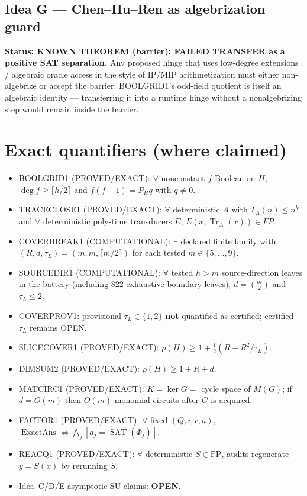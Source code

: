 \documentclass[11pt]{article}
\begin{document}
\subsection*{Idea G --- Chen--Hu--Ren as algebrization guard}
\textbf{Status: KNOWN THEOREM (barrier); FAILED TRANSFER as a positive SAT separation.}
Any proposed hinge that uses low-degree extensions / algebraic oracle access in the style of
IP/MIP arithmetization must either non-algebrize or accept the barrier. BOOLGRID1's odd-field
quotient is itself an algebraic identity --- transferring it into a runtime hinge without a
nonalgebrizing step would remain inside the barrier.

\section*{Exact quantifiers (where claimed)}
\begin{itemize}
\item BOOLGRID1 (PROVED/EXACT): $\forall$ nonconstant $f$ Boolean on $H$,
$\deg f\ge\lceil h/2\rceil$ and $f(f-1)=P_H q$ with $q\neq 0$.
\item TRACECLOSE1 (PROVED/EXACT): $\forall$ deterministic $A$ with $T_A(n)\le n^k$ and
$\forall$ deterministic poly-time transducers $E$, $E(x,\operatorname{Tr}_A(x))\in FP$.
\item COVERBREAK1 (COMPUTATIONAL): $\exists$ declared finite family with
$(R,d,\tau_L)=(m,m,\lceil m/2\rceil)$ for each tested $m\in\{5,\ldots,9\}$.
\item SOURCEDIR1 (COMPUTATIONAL): $\forall$ tested $h>m$ source-direction leaves in the battery
(including 822 exhaustive boundary leaves), $d=\binom{m}{2}$ and $\tau_L\le 2$.
\item COVERPROV1: provisional $\tau_L\in\{1,2\}$ \textbf{not} quantified as certified;
certified $\tau_L$ remains OPEN.
\item SLICECOVER1 (PROVED/EXACT): $\rho(H)\ge 1+\tfrac12(R+R^2/\tau_L)$.
\item DIMSUM2 (PROVED/EXACT): $\rho(H)\ge 1+R+d$.
\item MATCIRC1 (PROVED/EXACT): $K=\ker G=$ cycle space of $M(G)$; if $d=O(m)$ then
$O(m)$-monomial circuits after $G$ is acquired.
\item FACTOR1 (PROVED/EXACT): $\forall$ fixed $(Q,i,r,a)$,
$\operatorname{ExactAns}\iff\bigwedge_j[a_j=\operatorname{SAT}(\Phi_j)]$.
\item REACQ1 (PROVED/EXACT): $\forall$ deterministic $S\in\mathrm{FP}$, audits regenerate $y=S(x)$
by rerunning $S$.
\item Idea~C/D/E asymptotic SU claims: \textbf{OPEN}.
\end{itemize}
\end{document}
